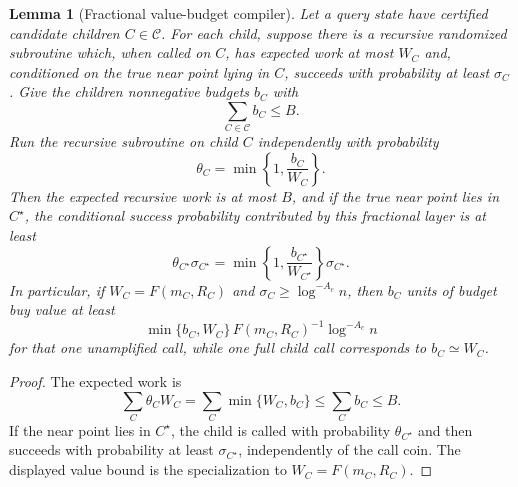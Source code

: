 \documentclass[10pt]{article}
\newtheorem{lemma}[theorem]{Lemma}
\theoremstyle{definition}
\begin{document}
\begin{lemma}[Fractional value-budget compiler]\label{lem:fractional-value-budget}
   Let a query state have certified candidate children $C\in\mathcal C$. For
   each child, suppose there is a recursive randomized subroutine which, when
   called on $C$, has expected work at most $W_C$ and, conditioned on the true
   near point lying in $C$, succeeds with probability at least $\sigma_C$. Give
   the children nonnegative budgets $b_C$ with
   \[
      \sum_{C\in\mathcal C} b_C\le B.
   \]
   Run the recursive subroutine on child $C$ independently with probability
   \[
      \theta_C=\min\left\{1,\frac{b_C}{W_C}\right\}.
   \]
   Then the expected recursive work is at most $B$, and if the true near point
   lies in $C^\star$, the conditional success probability contributed by this
   fractional layer is at least
   \[
      \theta_{C^\star}\sigma_{C^\star}
      =
      \min\left\{1,\frac{b_{C^\star}}{W_{C^\star}}\right\}
      \sigma_{C^\star}.
   \]
   In particular, if $W_C=F(m_C,R_C)$ and
   $\sigma_C\ge\log^{-A_c}n$, then $b_C$ units of budget buy value at least
   \[
      \min\{b_C,W_C\}\,F(m_C,R_C)^{-1}\log^{-A_c}n
   \]
   for that one unamplified call, while one full child call corresponds to
   $b_C\simeq W_C$.
\end{lemma}

\begin{proof}
   The expected work is
   \[
      \sum_C \theta_C W_C
      =
      \sum_C \min\{W_C,b_C\}
      \le
      \sum_C b_C
      \le B.
   \]
   If the near point lies in $C^\star$, the child is called with probability
   $\theta_{C^\star}$ and then succeeds with probability at least
   $\sigma_{C^\star}$, independently of the call coin. The displayed value
   bound is the specialization to $W_C=F(m_C,R_C)$.
\end{proof}
\end{document}
